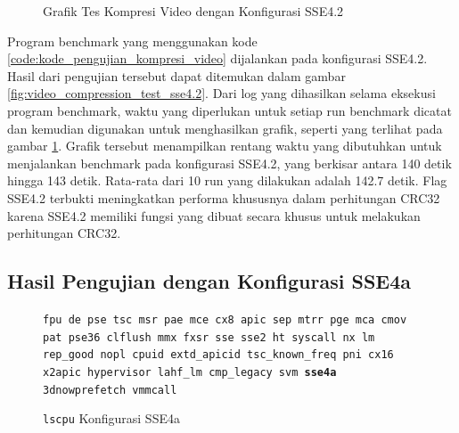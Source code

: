 \begin{figure}
    \centering
    \caption{Grafik Tes Kompresi Video dengan Konfigurasi SSE4.2}
    \label{fig:video_compression_test_sse4.2_graph}
\end{figure}

Program benchmark yang menggunakan kode \ref{code:kode_pengujian_kompresi_video} dijalankan pada konfigurasi SSE4.2. Hasil dari pengujian tersebut dapat ditemukan dalam gambar \ref{fig:video_compression_test_sse4.2}. Dari log yang dihasilkan selama eksekusi program benchmark, waktu yang diperlukan untuk setiap run benchmark dicatat dan kemudian digunakan untuk menghasilkan grafik, seperti yang terlihat pada gambar \ref{fig:video_compression_test_sse4.2_graph}. Grafik tersebut menampilkan rentang waktu yang dibutuhkan untuk menjalankan benchmark pada konfigurasi SSE4.2, yang berkisar antara 140 detik hingga 143 detik. Rata-rata dari 10 run yang dilakukan adalah 142.7 detik. Flag SSE4.2 terbukti meningkatkan performa khususnya dalam perhitungan CRC32 karena SSE4.2 memiliki fungsi yang dibuat secara khusus untuk melakukan perhitungan CRC32.

\subsection{Hasil Pengujian dengan Konfigurasi SSE4a}
\begin{figure}
    \texttt{fpu de pse tsc msr pae mce cx8 apic sep mtrr pge mca cmov pat pse36 clflush mmx fxsr sse sse2 ht syscall nx lm rep\_good nopl cpuid extd\_apicid tsc\_known\_freq pni cx16 x2apic hypervisor lahf\_lm cmp\_legacy svm \textbf{sse4a} 3dnowprefetch vmmcall}
    \caption{\texttt{lscpu} Konfigurasi SSE4a}
    \label{fig:lscpu_video_compression_test_sse4a}
\end{figure}

